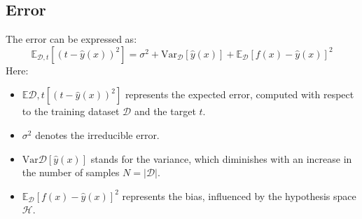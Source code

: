 \subsection{Error}
The error can be expressed as:
\[\mathbb{E}_{\mathcal{D},t}\left[\left(t-\hat{y}(x)\right)^2\right]=\sigma^2+\text{Var}_{\mathcal{D}}\left[\hat{y}(x)\right]+\mathbb{E}_{\mathcal{D}}\left[f(x)-\hat{y}(x)\right]^2\]
Here: 
\begin{itemize}
    \item $\mathbb{E}{\mathcal{D},t}\left[\left(t-\hat{y}(x)\right)^2\right]$ represents the expected error, computed with respect to the training dataset $\mathcal{D}$ and the target $t$.
    \item $\sigma^2$ denotes the irreducible error.
    \item $\text{Var}{\mathcal{D}}\left[\hat{y}(x)\right]$ stands for the variance, which diminishes with an increase in the number of samples $N=\left\lvert \mathcal{D}\right\rvert$.
    \item $\mathbb{E}_{\mathcal{D}}\left[f(x)-\hat{y}(x)\right]^2$ represents the bias, influenced by the hypothesis space $\mathcal{H}$.
\end{itemize}